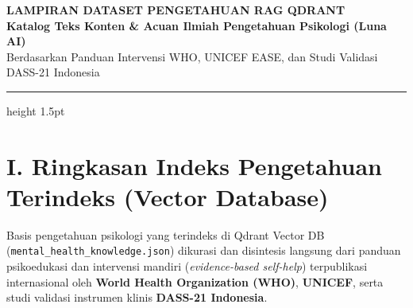 \documentclass[11pt,a4paper]{article}
\begin{document}
\begin{center}
    {\LARGE \bfseries \color{LunaPrimary} LAMPIRAN DATASET PENGETAHUAN RAG QDRANT} \\[0.4em]
    {\large \bfseries \color{LunaSecondary} Katalog Teks Konten \& Acuan Ilmiah Pengetahuan Psikologi (Luna AI)} \\[0.3em]
    {\small \color{LunaGrayText} Berdasarkan Panduan Intervensi WHO, UNICEF EASE, dan Studi Validasi DASS-21 Indonesia}
\end{center}

\vspace{0.3cm}
\hrule height 1.5pt \relax
\vspace{0.5cm}

\section*{\color{LunaPrimary} I. Ringkasan Indeks Pengetahuan Terindeks (Vector Database)}

Basis pengetahuan psikologi yang terindeks di Qdrant Vector DB (\texttt{mental\_health\_knowledge.json}) dikurasi dan disintesis langsung dari panduan psikoedukasi dan intervensi mandiri (\textit{evidence-based self-help}) terpublikasi internasional oleh \textbf{World Health Organization (WHO)}, \textbf{UNICEF}, serta studi validasi instrumen klinis \textbf{DASS-21 Indonesia}.

\vspace{0.2cm}
\end{document}

